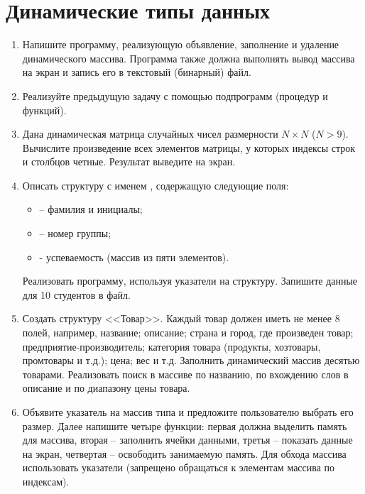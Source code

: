 \chapter{Динамические типы данных}
\begin{enumerate}[leftmargin=*]
    \item Напишите программу, реализующую объявление, заполнение и удаление динамического массива. Программа также должна выполнять вывод массива на экран и запись его в текстовый (бинарный) файл.
    \item Реализуйте предыдущую задачу с помощью подпрограмм (процедур и функций).
    \item Дана динамическая матрица случайных чисел размерности $N\times N$ ($N>9$). Вычислите произведение всех элементов матрицы, у которых индексы строк и столбцов четные. Результат выведите на экран.
    \item Описать структуру с именем , содержащую следующие поля:
        \begin{itemize}
            \item {} – фамилия и инициалы;
            \item {} – номер группы;
            \item {} - успеваемость (массив из пяти элементов).
        \end{itemize}
    Реализовать программу, используя указатели на структуру. Запишите данные для 10 студентов в файл.
    \item Создать структуру <<Товар>>. Каждый товар должен иметь не менее 8 полей, например, название; описание; страна и город, где произведен товар; предприятие-производитель; категория товара (продукты, хозтовары, промтовары и т.д.); цена; вес и т.д. Заполнить динамический массив десятью товарами. Реализовать поиск в массиве по названию, по вхождению слов в описание и по диапазону цены товара.
    \item Объявите указатель на массив типа  и предложите пользователю выбрать его размер. Далее напишите четыре функции: первая должна выделить память для массива, вторая – заполнить ячейки данными, третья – показать данные на экран, четвертая – освободить занимаемую память. Для обхода массива использовать указатели (запрещено обращаться к элементам массива по индексам).
\end{enumerate}
%
